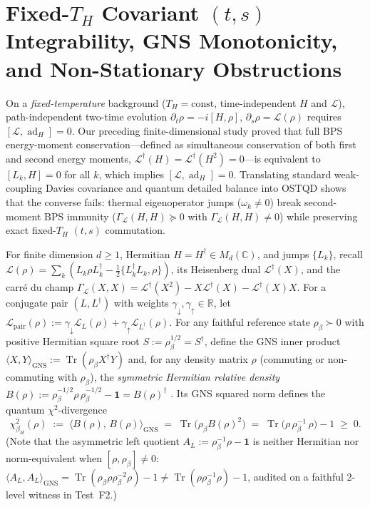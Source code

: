 \documentclass[11pt,a4paper]{article}
\theoremstyle{definition}
\theoremstyle{remark}
\newcommand{\Tr}{\operatorname{Tr}}
\newcommand{\ad}{\operatorname{ad}}
\newcommand{\cL}{\mathcal{L}}
\newcommand{\bbC}{\mathbb{C}}
\newcommand{\bbR}{\mathbb{R}}
\newcommand{\1}{\mathbf{1}}
\begin{document}
\section{Fixed-\texorpdfstring{$T_H$}{TH} Covariant \texorpdfstring{$(t,s)$}{(t,s)} Integrability, GNS Monotonicity, and Non-Stationary Obstructions}\label{sec:covariant-kms}

On a \emph{fixed-temperature} background ($T_H = \text{const}$, time-independent $H$ and $\cL$), path-independent two-time evolution $\partial_t\rho = -i[H,\rho]$, $\partial_s\rho = \cL(\rho)$ requires $[\cL,\ad_H]=0$. Our preceding finite-dimensional study \cite{Soga2026OSTQD} proved that full BPS energy-moment conservation---defined as simultaneous conservation of both first and second energy moments, $\cL^\dagger(H) = \cL^\dagger(H^2) = 0$---is equivalent to $[L_k, H]=0$ for all $k$, which implies $[\cL,\ad_H]=0$. Translating standard weak-coupling Davies covariance and quantum detailed balance \cite{Davies1974,Alicki1976,Temme2010,AlhambraWoods2017} into OSTQD shows that the converse fails: thermal eigenoperator jumps ($\omega_k \neq 0$) break second-moment BPS immunity ($\Gamma_\cL(H,H)\succeq 0$ with $\Gamma_\cL(H,H)\neq 0$) while preserving exact fixed-$T_H$ $(t,s)$ commutation.

For finite dimension $d \ge 1$, Hermitian $H=H^\dagger\in M_d(\bbC)$, and jumps $\{L_k\}$, recall $\cL(\rho)=\sum_k(L_k\rho L_k^\dagger - \frac{1}{2}\{L_k^\dagger L_k,\rho\})$, its Heisenberg dual $\cL^\dagger(X)$, and the carr\'e du champ $\Gamma_\cL(X,X) = \cL^\dagger(X^2) - X\cL^\dagger(X) - \cL^\dagger(X)X$. For a conjugate pair $(L,L^\dagger)$ with weights $\gamma_\downarrow,\gamma_\uparrow\in\bbR$, let $\cL_{\mathrm{pair}}(\rho) := \gamma_\downarrow\cL_L(\rho) + \gamma_\uparrow\cL_{L^\dagger}(\rho)$. For any faithful reference state $\rho_\beta \succ 0$ with positive Hermitian square root $S := \rho_\beta^{1/2} = S^\dagger$, define the GNS inner product $\langle X,Y\rangle_{\mathrm{GNS}} := \Tr(\rho_\beta X^\dagger Y)$ and, for any density matrix $\rho$ (commuting or non-commuting with $\rho_\beta$), the \emph{symmetric Hermitian relative density} $B(\rho) := \rho_\beta^{-1/2}\rho\,\rho_\beta^{-1/2} - \1 = B(\rho)^\dagger$ \cite{Temme2010,AlhambraWoods2017}. Its GNS squared norm defines the quantum $\chi^2$-divergence
\begin{equation}\label{eq:gns-chi2-def}
  \chi^2_{\beta_H}(\rho) \;:=\; \bigl\langle B(\rho),\, B(\rho)\bigr\rangle_{\mathrm{GNS}}
  \;=\; \Tr\bigl(\rho_\beta B(\rho)^2\bigr)
  \;=\; \Tr\bigl(\rho\,\rho_\beta^{-1}\,\rho\bigr) - 1 \;\ge\; 0.
\end{equation}
(Note that the asymmetric left quotient $A_L := \rho_\beta^{-1}\rho - \1$ is neither Hermitian nor norm-equivalent when $[\rho,\rho_\beta]\neq 0$: $\langle A_L,A_L\rangle_{\mathrm{GNS}}=\Tr(\rho_\beta\rho\rho_\beta^{-2}\rho)-1 \neq \Tr(\rho\rho_\beta^{-1}\rho)-1$, audited on a faithful 2-level witness in Test~F2.)
\end{document}
